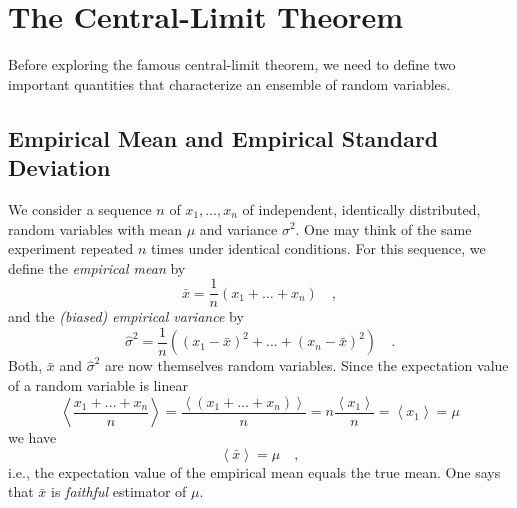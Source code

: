 \documentclass{notebook}
\begin{document}
\section{The Central-Limit Theorem}

Before exploring the famous central-limit theorem, we need to define two important quantities that characterize an ensemble of random variables. 

\subsection*{Empirical Mean and Empirical Standard Deviation}

We consider a sequence $n$ of $x_1, \dots, x_n$ of independent, identically distributed, random variables with mean $\mu$ and variance $\sigma^2$.  One may think of the same experiment repeated $n$ times under identical conditions. For this sequence, we define the \textit{empirical mean} by
%
\begin{equation}
\bar{x} = \frac{1}{n}(x_1 + \dots + x_n) \quad,
\end{equation}
%
and the \textit{(biased) empirical variance} by 
%
\begin{equation}
	\widehat{\sigma}^2 = \frac{1}{n} \left(
	\left(x_1-\bar{x}\right)^2  + \dots + \left(x_n-\bar{x}\right)^2
	\right) \quad.
\end{equation}
%
Both, $\bar{x}$ and $\widehat{\sigma}^2$ are now themselves random variables. Since the expectation value of a random variable is linear
%
\begin{equation*}
	\left\langle \frac{x_1 + \dots + x_n}{n} \right\rangle 
	= \frac{\left\langle(x_1 + \dots + x_n)  \right\rangle}{n}
	= n \frac{\left\langle x_1 \right\rangle}{n} = \left\langle x_1 \right\rangle = \mu
\end{equation*}
%
we have 
%
\begin{equation}
	\left\langle \bar{x} \right\rangle = \mu \quad,
\end{equation}
%
i.e., the expectation value of the empirical mean equals the true mean. One says that $\bar{x}$ is \textit{faithful} estimator of $\mu$. 
\end{document}
